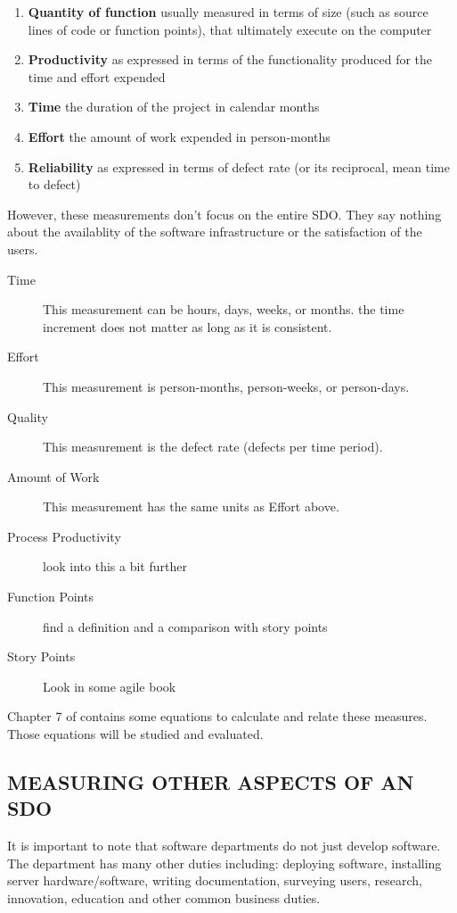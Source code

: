 \documentclass[SDSUThesis.tex]{subfiles}
\begin{document}
    \begin{enumerate}
        \item \textbf{Quantity of function} usually measured in terms of size (such as source lines of code or function points), that ultimately execute on the computer
        \item \textbf{Productivity} as expressed in terms of the functionality produced for the time and effort expended
        \item \textbf{Time} the duration of the project in calendar months
        \item \textbf{Effort} the amount of work expended in person-months
        \item \textbf{Reliability} as expressed in terms of defect rate (or its reciprocal, mean time to defect)
    \end{enumerate}
    However, these measurements don't focus on the entire SDO. They say nothing about the availablity of the software infrastructure or the satisfaction of the users.
    
    \begin{description}
      \item[Time] This measurement can be hours, days, weeks, or months.  the time increment does not matter as long as it is consistent.
      \item[Effort] This measurement is person-months, person-weeks, or person-days.
      \item[Quality] This measurement is the defect rate (defects per time period).
      \item[Amount of Work] This measurement has the same units as Effort above. 
      \item[Process Productivity] look into this a bit further
      \item[Function Points] find a definition and a comparison with story points
      \item[Story Points] Look in some agile book
    \end{description}
    
    Chapter 7 of \cite{Putnam2013} contains some equations to calculate and relate
    these measures. Those equations will be studied and evaluated.


    \subsection{MEASURING OTHER ASPECTS OF AN SDO}
    
        It is important to note that software departments do not just
        develop software.  The department has many other duties
        including: deploying software, installing server hardware/software,
        writing documentation, surveying users, research, innovation,
        education and other common business duties.
    
\end{document}

